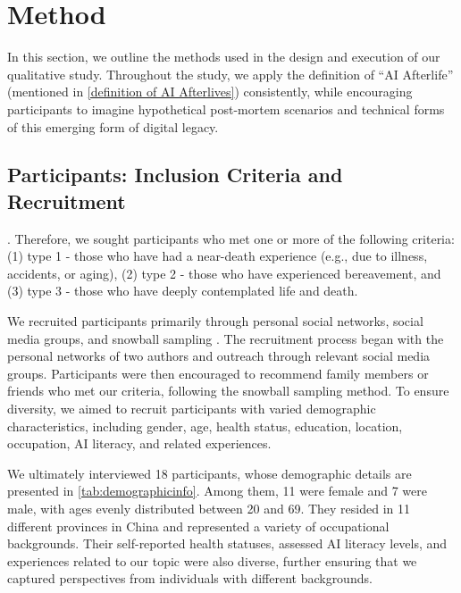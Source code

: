 \section{Method} 
In this section, we outline the methods used in the design and execution of our qualitative study. 
Throughout the study, we apply the definition of ``AI Afterlife'' (mentioned in \autoref{definition of AI Afterlives}) consistently, while encouraging participants to imagine hypothetical post-mortem scenarios and technical forms of this emerging form of digital legacy.

\subsection{Participants: Inclusion Criteria and Recruitment}

 \cite{doyle2023digital}. Therefore, we sought participants who met one or more of the following criteria: (1) type 1 - those who have had a near-death experience (e.g., due to illness, accidents, or aging), (2) type 2 - those who have experienced bereavement, and (3) type 3 - those who have deeply contemplated life and death.

We recruited participants primarily through personal social networks, social media groups, and snowball sampling \cite{goodman1961snowball}. The recruitment process began with the personal networks of two authors 
and outreach through relevant social media groups. Participants were then encouraged to recommend family members or friends who met our criteria, following the snowball sampling method. To ensure diversity, we aimed to recruit participants with varied demographic characteristics, including gender, age, health status, education, location, occupation, AI literacy, and related experiences.

 We ultimately interviewed 18 participants, whose demographic details are presented in \autoref{tab:demographicinfo}. Among them, 11 were female and 7 were male, with ages evenly distributed between 20 and 69. They resided in 11 different provinces in China and represented a variety of occupational backgrounds. Their self-reported health statuses, assessed AI literacy levels, and experiences related to our topic were also diverse, further ensuring that we captured perspectives from individuals with different backgrounds.

